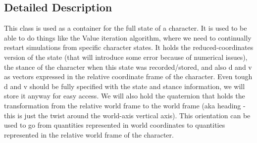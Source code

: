 \subsection{Detailed Description}
This class is used as a container for the full state of a character. It is used to be able to do things like the Value iteration algorithm, where we need to continually restart simulations from specific character states. It holds the reduced-\/coordinates version of the state (that will introduce some error because of numerical issues), the stance of the character when this state was recorded/stored, and also d and v as vectors expressed in the relative coordinate frame of the character. Even tough d and v should be fully specified with the state and stance information, we will store it anyway for easy access. We will also hold the quaternion that holds the transformation from the relative world frame to the world frame (aka heading -\/ this is just the twist around the world-\/axis vertical axis). This orientation can be used to go from quantities represented in world coordinates to quantities represented in the relative world frame of the character. 


